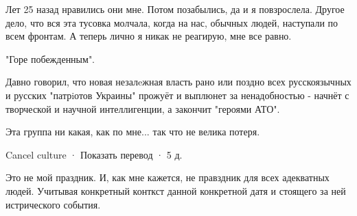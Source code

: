 \begin{itemize}
 

Лет 25 назад нравились они мне. Потом позабылись, да и я повзрослела. Другое
дело, что вся эта тусовка молчала, когда на нас, обычных людей, наступали по
всем фронтам. А теперь лично я никак не реагирую, мне все равно.

 
"Горе побежденным".

Давно говорил, что новая незалeжная власть рано или поздно всех русскоязычных и
русских "патрiотов Украины" прожуёт и выплюнет за ненадобностью - начнёт с
творческой и научной интеллигенции, а закончит "героями АТО".


 
Эта группа ни какая, как по мне... так что не велика потеря.

 
Cancel culture
 · Показать перевод · 5 д.
 

Это не мой праздник. И, как мне кажется, не правздник для всех адекватных
людей. Учитывая конкретный конткст данной конкретной датя и стоящего за ней
истрического события.

 

\end{itemize}
